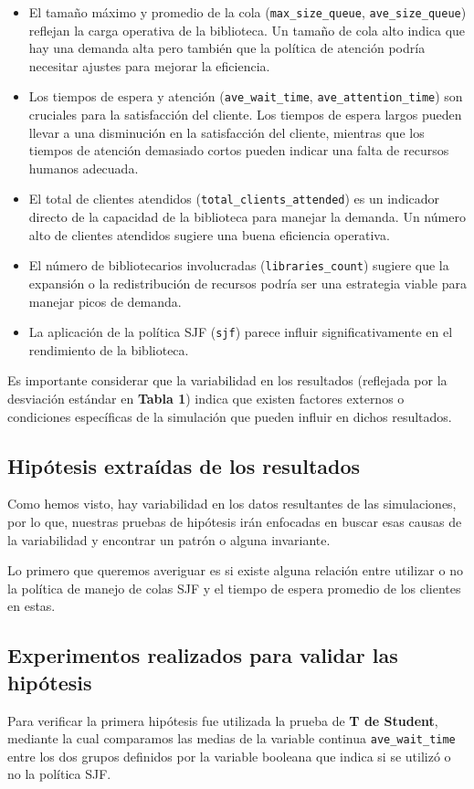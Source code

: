 \documentclass[10pt,twocolumn]{article}
\begin{document}
\begin{itemize}
	\item El tamaño máximo y promedio de la cola (\texttt{max\_size\_queue}, \texttt{ave\_size\_queue}) reflejan la carga operativa de la biblioteca. Un tamaño de cola alto indica que hay una demanda alta pero también que la política de atención podría necesitar ajustes para mejorar la eficiencia.
	\item Los tiempos de espera y atención (\texttt{ave\_wait\_time}, \texttt{ave\_attention\_time}) son cruciales para la satisfacción del cliente. Los tiempos de espera largos pueden llevar a una disminución en la satisfacción del cliente, mientras que los tiempos de atención demasiado cortos pueden indicar una falta de recursos humanos adecuada.
	\item El total de clientes atendidos (\texttt{total\_clients\_attended}) es un indicador directo de la capacidad de la biblioteca para manejar la demanda. Un número alto de clientes atendidos sugiere una buena eficiencia operativa.
	\item El número de bibliotecarios involucradas (\texttt{libraries\_count}) sugiere que la expansión o la redistribución de recursos podría ser una estrategia viable para manejar picos de demanda.
	\item La aplicación de la política SJF (\texttt{sjf}) parece influir significativamente en el rendimiento de la biblioteca.
\end{itemize}

Es importante considerar que la variabilidad en los resultados (reflejada por la desviación estándar en \textbf{Tabla 1}) indica que existen factores externos o condiciones específicas de la simulación que pueden influir en dichos resultados.

\subsection{Hipótesis extraídas de los resultados}
Como hemos visto, hay variabilidad en los datos resultantes de las simulaciones, por lo que, nuestras pruebas de hipótesis irán enfocadas en buscar esas causas de la variabilidad y encontrar un patrón o alguna invariante.

\vspace{1cm}
Lo primero que queremos averiguar es si existe alguna relación entre utilizar o no la política de manejo de colas SJF y el tiempo de espera promedio de los clientes en estas.

\subsection{Experimentos realizados para validar las hipótesis}
Para verificar la primera hipótesis fue utilizada la prueba de \textbf{T de Student}, mediante la cual comparamos las medias de la variable continua \texttt{ave\_wait\_time} entre los dos grupos definidos por la variable booleana que indica si se utilizó o no la política SJF.
\end{document}
